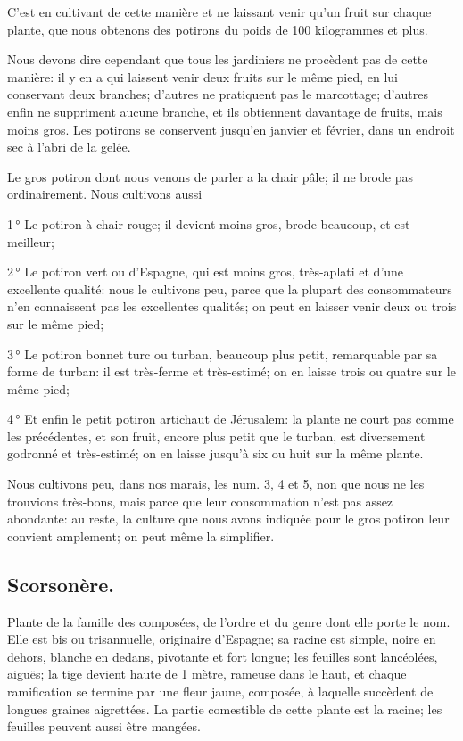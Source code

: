 \documentclass[10pt,a4paper]{book}
\begin{document}
C'est en cultivant de cette manière et ne laissant venir qu'un fruit sur chaque plante, que nous obtenons des potirons du poids de 100 kilogrammes et plus.

Nous devons dire cependant que tous les jardiniers ne procèdent pas de cette manière: il y en a qui laissent venir deux fruits sur le même pied, en lui conservant deux branches; d'autres ne pratiquent pas le marcottage; d'autres enfin ne suppriment aucune branche, et ils obtiennent davantage de fruits, mais moins gros. Les potirons se conservent jusqu'en janvier et février, dans un endroit sec à l'abri de la gelée.

Le gros potiron dont nous venons de parler a la chair pâle; il ne brode pas ordinairement. Nous cultivons aussi

1\,° Le potiron à chair rouge; il devient moins gros, brode beaucoup, et est meilleur;

2\,° Le potiron vert ou d'Espagne, qui est moins gros, très-aplati et d'une excellente qualité: nous le cultivons peu, parce que la plupart des consommateurs n'en connaissent pas les excellentes qualités; on peut en laisser venir deux ou trois sur le même pied;

3\,° Le potiron bonnet turc ou turban, beaucoup plus petit, remarquable par sa forme de turban: il est très-ferme et très-estimé; on en laisse trois ou quatre sur le même pied;

4\,° Et enfin le petit potiron artichaut de Jérusalem: la plante ne court pas comme les précédentes, et son fruit, encore plus petit que le turban, est diversement godronné et très-estimé; on en laisse jusqu'à six ou huit sur la même plante.

Nous cultivons peu, dans nos marais, les num. 3, 4 et 5, non que nous ne les trouvions très-bons, mais parce que leur consommation n'est pas assez abondante: au reste, la culture que nous avons indiquée pour le gros potiron leur convient amplement; on peut même la simplifier.

\subsection{Scorsonère.}

Plante de la famille des composées, de l'ordre et du genre dont elle porte le nom. Elle est bis ou trisannuelle, originaire d'Espagne; sa racine est simple, noire en dehors, blanche en dedans, pivotante et fort longue; les feuilles sont lancéolées, aiguës; la tige devient haute de 1 mètre, rameuse dans le haut, et chaque ramification se termine par une fleur jaune, composée, à laquelle succèdent de longues graines aigrettées. La partie comestible de cette plante est la racine; les feuilles peuvent aussi être mangées.
\end{document}
